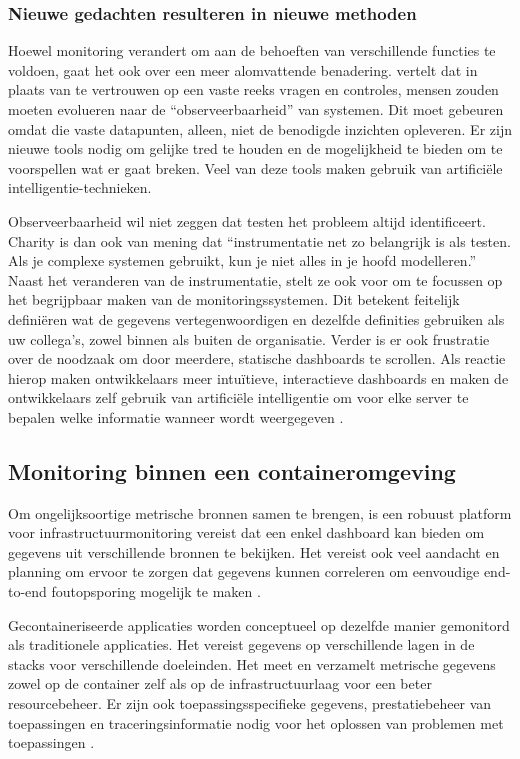 \subsubsection{Nieuwe gedachten resulteren in nieuwe methoden}

Hoewel monitoring verandert om aan de behoeften van verschillende functies te voldoen, gaat het ook over een meer alomvattende benadering. \textcite{Charity2016} vertelt dat in plaats van te vertrouwen op een vaste reeks vragen en controles, mensen zouden moeten evolueren naar de “observeerbaarheid” van systemen. Dit moet gebeuren omdat die vaste datapunten, alleen, niet de benodigde inzichten opleveren. Er zijn nieuwe tools nodig om gelijke tred te houden en de mogelijkheid te bieden om te voorspellen wat er gaat breken. Veel van deze tools maken gebruik van artificiële intelligentie-technieken. 

Observeerbaarheid wil niet zeggen dat testen het probleem altijd identificeert. Charity is dan ook van mening dat “instrumentatie net zo belangrijk is als testen. Als je complexe systemen gebruikt, kun je niet alles in je hoofd modelleren.” Naast het veranderen van de instrumentatie, stelt ze ook voor om te focussen op het begrijpbaar maken van de monitoringssystemen. Dit betekent feitelijk definiëren wat de gegevens vertegenwoordigen en dezelfde definities gebruiken als uw collega's, zowel binnen als buiten de organisatie. Verder is er ook frustratie over de noodzaak om door meerdere, statische dashboards te scrollen. Als reactie hierop maken ontwikkelaars meer intuïtieve, interactieve dashboards en maken de ontwikkelaars zelf gebruik van artificiële intelligentie om voor elke server te bepalen welke informatie wanneer wordt weergegeven \autocite{Williams2016}.

\subsection{Monitoring binnen een containeromgeving}

Om ongelijksoortige metrische bronnen samen te brengen, is een robuust platform voor infrastructuurmonitoring vereist dat een enkel dashboard kan bieden om gegevens uit verschillende bronnen te bekijken. Het vereist ook veel aandacht en planning om ervoor te zorgen dat gegevens kunnen correleren om eenvoudige end-to-end foutopsporing mogelijk te maken \autocite{AWS2021}.

Gecontaineriseerde applicaties worden conceptueel op dezelfde manier gemonitord als traditionele applicaties. Het vereist gegevens op verschillende lagen in de stacks voor verschillende doeleinden. Het meet en verzamelt metrische gegevens zowel op de container zelf als op de infrastructuurlaag voor een beter resourcebeheer. Er zijn ook toepassingsspecifieke gegevens, prestatiebeheer van toepassingen en traceringsinformatie nodig voor het oplossen van problemen met toepassingen \autocite{AWS2021}.

